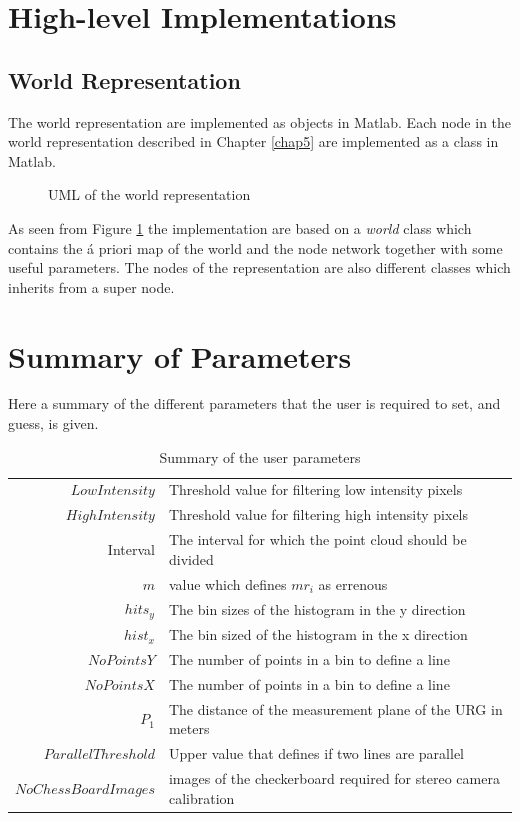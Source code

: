 \section{High-level Implementations}

\subsection{World Representation}
The world representation are implemented as objects in Matlab. Each node in the world
representation described in Chapter \ref{chap5} are implemented as a class in Matlab. 
\begin{figure}[htbp]
    \centering
    \caption{UML of the world representation}
    \label{chap6:fig-world-uml}
\end{figure}

As seen from Figure \ref{chap6:fig-world-uml} the implementation are based on a
\emph{world} class which contains the á priori map of the world and the node network
together with some useful parameters. The nodes of the representation are also different
classes which inherits from a super node. 


\section{Summary of Parameters}
Here a summary of the different parameters that the user is required to set, and guess, is
given. 
\begin{table}[htbp]
    \centering
    \begin{tabular}{|r|l|}
        \hline
        $LowIntensity$ &  Threshold value for filtering low intensity pixels   \\
        $HighIntensity$ & Threshold value for filtering high intensity pixels  \\
        Interval      &  The interval for which the point cloud should be divided \\
        $m$             &  value which defines $m r_i$ as errenous             \\
        \hline
        $hits_y$    &  The bin sizes of the histogram in the y direction       \\
        $hist_x$    &  The bin sized of the histogram in the x direction       \\
        $NoPointsY$ &  The number of points in a bin to define a line          \\
        $NoPointsX$ &  The number of points in a bin to define a line         \\
        $P_1$       &  The distance of the measurement plane of the URG in meters\\
        $ParallelThreshold$ &  Upper value that defines if two lines are parallel \\
        \hline
        $NoChessBoardImages$ & images of the checkerboard required for stereo camera calibration         \\
        \hline
    \end{tabular}
    \caption{Summary of the user parameters}
    \label{chap6:tab-user-parameters}
\end{table}

